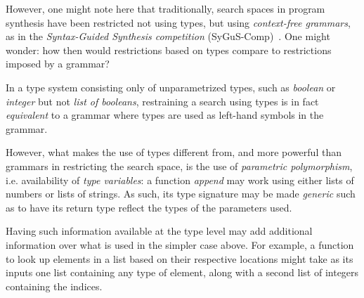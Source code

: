\documentclass{article}
\begin{document}

However, one might note here that traditionally,
search spaces in program synthesis have been restricted not using types,
but using \emph{context-free grammars},
as in the
\emph{Syntax-Guided Synthesis competition} (SyGuS-Comp)~\citep{sygus}.
One might wonder: how then would restrictions based on
types compare to restrictions imposed by a grammar?

In a type system consisting only of unparametrized types,
such as \emph{boolean} or \emph{integer} but not \emph{list of booleans},
restraining a search using types is in fact \emph{equivalent}
to a grammar where types are used as left-hand symbols in the grammar.%

However,
what makes the use of types different from,
and more powerful than grammars in restricting the search space,
is the use of \emph{parametric polymorphism}, i.e. availability of \emph{type variables}:
a function \emph{append} may work using either lists of numbers or lists of strings.
As such, its type signature may be made \emph{generic} such as to have its return type reflect the types of the parameters used.

Having such information available at the type level may add additional information over what is used in the simpler case above.
For example, a function to look up elements in a list based on their respective locations might take as its inputs one list containing any type of element, along with a second list of integers containing the indices.
\end{document}
